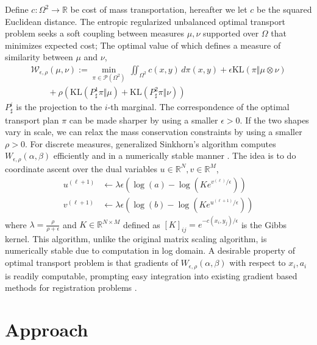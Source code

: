 \documentclass{6838publ}
\newcommand\sP{\ensuremath{\mathcal{P}}}
\newcommand\sW{\ensuremath{\mathcal{W}}}
\newcommand\R{\ensuremath{\mathbb{R}}} %
\newcommand\pb[1]{\ensuremath{\left[ #1 \right]}} %
\begin{document}
Define $c:\Omega^2 \to \R$ be cost of mass transportation, hereafter we let $c$ be the squared Euclidean distance. The entropic regularized unbalanced optimal transport problem seeks a soft coupling between measures $\mu,\nu$ supported over $\Omega$ that minimizes expected cost; The optimal value of which defines a measure of similarity between $\mu$ and $\nu$,
\begin{align}
    \sW_{\epsilon,\rho}(\mu,\nu)
        := \min_{\pi\in\sP(\Omega^2)}\,
            \iint_{\Omega^2} c(x,y)\, d\pi(x,y) + \epsilon \text{KL}(\pi \Vert \mu\otimes\nu) \\
                \quad\quad+\rho\left( \text{KL}(P^1_\sharp \pi \Vert \mu) + \text{KL}(P^2_\sharp \pi \Vert \nu) \right)
    \label{eq:ot_wasserstein_regularized_unbalanced}
\end{align}
$P^i_\sharp$ is the projection to the $i$-th marginal. The correspondence of the optimal transport plan $\pi$ can be made sharper by using a smaller $\epsilon >0$. If the two shapes vary in scale, we can relax the mass conservation constraints by using a smaller $\rho>0$. For discrete measures, generalized Sinkhorn's algorithm computes $W_{\epsilon,\rho}(\alpha,\beta)$ efficiently and in a numerically stable manner \cite{chizatScalingAlgorithmsUnbalanced2017,feydyInterpolatingOptimalTransport2018}. The idea is to do coordinate ascent over the dual variables $u\in\R^N,v\in\R^M$,
\begin{align}
    u^{(\ell+1)}
        &\leftarrow \lambda\epsilon \left( \log(a) - \log(Ke^{v^{(\ell)}/\epsilon}) \right) \\
    v^{(\ell+1)}
        &\leftarrow \lambda\epsilon \left( \log(b) - \log(Ke^{u^{(\ell+1)}/\epsilon}) \right)
    \label{eq:sinkhorn_dual_ascent}
\end{align}
where $\lambda = \frac{\rho}{\rho+\epsilon}$ and $K\in\R^{N\times M}$ defined as $\pb{K}_{ij} = e^{-c(x_i,y_j)/\epsilon}$ is the Gibbs kernel. This algorithm, unlike the original matrix scaling algorithm, is numerically stable due to computation in log domain. A desirable property of optimal transport problem is that gradients of $W_{\epsilon,\rho}(\alpha,\beta)$ with respect to $x_i,a_i$ is readily computable, prompting easy integration into existing gradient based methods for registration problems \cite{feydyOptimalTransportDiffeomorphic2017a}. 


\section{Approach}\label{sec:approach}
\end{document}
